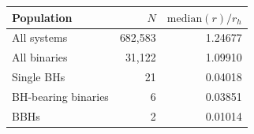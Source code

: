 \begin{ruledtabular}
\begin{tabular}{lrr}
Population & $N$ & $\mathrm{median}(r)/r_h$ \\
\hline
All systems & 682,583 & 1.24677 \\
All binaries & 31,122 & 1.09910 \\
Single BHs & 21 & 0.04018 \\
BH-bearing binaries & 6 & 0.03851 \\
BBHs & 2 & 0.01014 \\
\end{tabular}
\end{ruledtabular}
